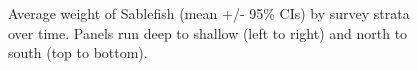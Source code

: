 \documentclass[12pt]{article}\usepackage[]{graphicx}\usepackage[]{color}
\begin{document}
\begin{figure}[htb]

{\centering {} 

}

\caption{Average weight of Sablefish (mean +/- 95\% CIs) by survey strata over time. Panels run deep to shallow (left to right) and north to south (top to bottom).}\label{fig:figure8}
\end{figure}
\clearpage
\end{document}
